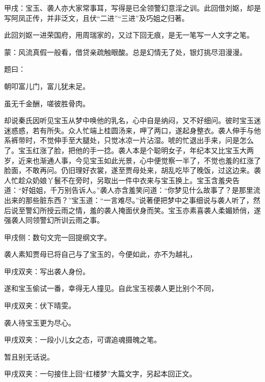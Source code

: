 \begin{parag}
    \begin{note}甲戌：宝玉、袭人亦大家常事耳，写得是已全领警幻意淫之训。此回借刘妪，却是写阿凤正传，并非泛文，且伏“二进”“三进”及巧姐之归著。\end{note}
\end{parag}


\begin{parag}
    \begin{note}此回刘妪一进荣国府，用周瑞家的，又过下回无痕，是无一笔写一人文字之笔。\end{note}
\end{parag}


\begin{parag}
    \begin{note}蒙：风流真假一般看，借贷亲疏触眼酸。总是幻情无了处，银灯挑尽泪漫漫。\end{note}
\end{parag}


\begin{parag}
    题曰：
\end{parag}


\begin{poem}
    \begin{pl}朝叩富儿门，富儿犹未足。\end{pl}

    \begin{pl}虽无千金酬，嗟彼胜骨肉。\end{pl}
\end{poem}


\begin{parag}
    却说秦氏因听见宝玉从梦中唤他的乳名，心中自是纳闷，又不好细问。彼时宝玉迷迷惑惑，若有所失。众人忙端上桂圆汤来，呷了两口，遂起身整衣。袭人伸手与他系裤带时，不觉伸手至大腿处，只觉冰凉一片沾湿。唬的忙退出手来，问是怎么了。宝玉红涨了脸，把他的手一捻。袭人本是个聪明女子，年纪本又比宝玉大两岁，近来也渐通人事，今见宝玉如此光景，心中便觉察一半了，不觉也羞的红涨了脸面，不敢再问。仍旧理好衣裳，遂至贾母处来，胡乱吃毕了晚饭，过这边来。袭人忙趁众奶娘丫鬟不在旁时，另取出一件中衣来与宝玉换上。宝玉含羞央告道：“好姐姐，千万别告诉人。”袭人亦含羞笑问道：“你梦见什么故事了？是那里流出来的那些脏东西？”宝玉道：“一言难尽。”说著便把梦中之事细说与袭人听了，然后说至警幻所授云雨之情，羞的袭人掩面伏身而笑。宝玉亦素喜袭人柔媚娇俏，遂强袭人同领警幻所训云雨之事。\begin{note}甲戌侧：数句文完一回提纲文字。\end{note}袭人素知贾母已将自己与了宝玉的，今便如此，亦不为越礼，\begin{note}甲戌双夹：写出袭人身份。\end{note}遂和宝玉偷试一番，幸得无人撞见。自此宝玉视袭人更比别个不同，\begin{note}甲戌双夹：伏下晴雯。\end{note}袭人待宝玉更为尽心。\begin{note}甲戌双夹：一段小儿女之态，可谓追魂摄魄之笔。\end{note}暂且别无话说。\begin{note}甲戌双夹：一句接住上回“红楼梦”大篇文字，另起本回正文。\end{note}
\end{parag}


